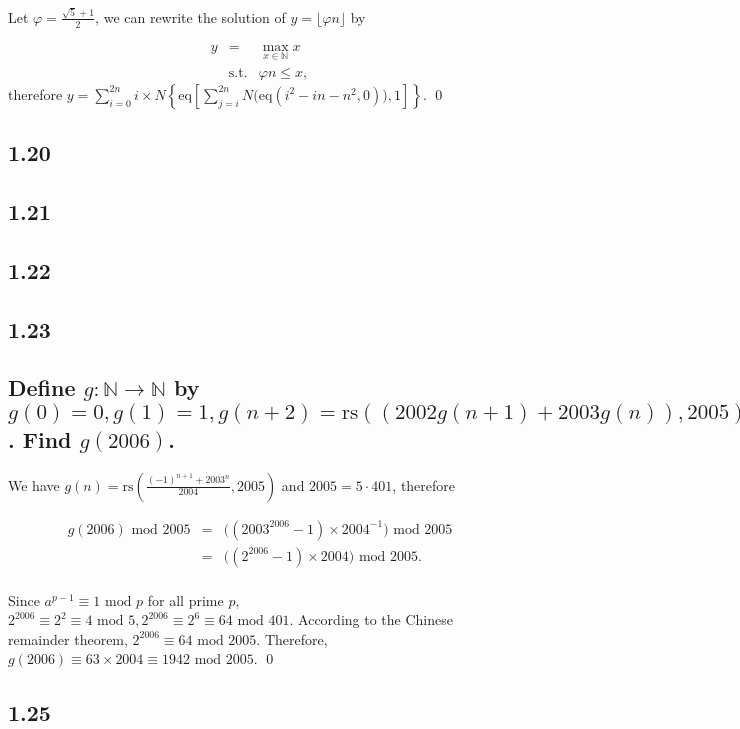 \documentclass[11pt]{article}
\newcommand{\rs}{\mathrm{rs}}
\newcommand{\eq}{\mathrm{eq}}
\newcommand{\mod}{\textrm{ mod }}
\begin{document}
\begin{pf} \rm
Let $\varphi = \frac{\sqrt{5}+1}{2}$, we can rewrite the solution of 
$y=\lfloor \varphi n\rfloor$ by

\[
\begin{array}{rcl}
 y &= & \displaystyle \max_{x\in\mathbb{N}} x \\
 & \mathrm{s.t.} & \varphi n \leq x,
\end{array}
\]
\noindent
therefore
$ \displaystyle y = 
 \sum_{i = 0}^{2n}
 i\times N \left\{
 \eq \left[
  \sum_{j = i}^{2n} N\Big(\eq(i^2 - in - n^2, 0)\Big)
 , 1
 \right] \right\} $.
\qed
\end{pf}

\subsection{1.20}

\subsection{1.21}

\subsection{1.22}

\subsection{1.23}

\subsection{Define $g:\mathbb{N}\to\mathbb{N}$ by 
$g(0) = 0, g(1) = 1, g(n + 2) = \rs((2002g(n + 1) + 2003g(n)), 2005)$. Find $g(2006)$.}

\begin{pf} \rm
We have $\displaystyle g(n) = \rs \left( \frac{(-1)^{n+1} + 2003^n}{2004} , 2005 \right)$
and $2005=5\cdot 401$, therefore
 
\[
 \begin{array}{rcl}
   g(2006) \mod 2005 & = & \Big((2003^{2006} - 1) \times 2004^{-1} \Big) \mod 2005 \\
                     & = & \Big((2^{2006} - 1) \times 2004\Big) \mod 2005. \\
 \end{array}
\]

Since $a^{p-1} \equiv 1\mod p$ for all prime $p$,
$2^{2006} \equiv 2^2 \equiv 4\mod 5, 2^{2006} \equiv 2^6 \equiv 64 \mod 401$.
According to the Chinese remainder theorem,
$2^{2006} \equiv 64\mod 2005$. Therefore, $g(2006) \equiv 63\times2004
\equiv 1942\mod 2005$. \qed

\end{pf}

\subsection{1.25}


\newpage
\end{document}
